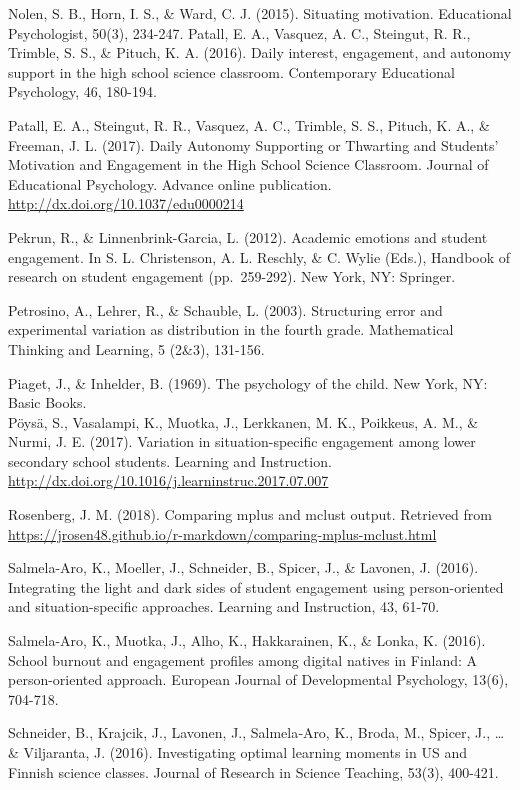 \documentclass[]{msu-thesis}
\theoremstyle{definition}
\theoremstyle{definition}
\theoremstyle{definition}
\theoremstyle{remark}
\begin{document}
Nolen, S. B., Horn, I. S., \& Ward, C. J. (2015). Situating motivation.
Educational Psychologist, 50(3), 234-247. Patall, E. A., Vasquez, A. C.,
Steingut, R. R., Trimble, S. S., \& Pituch, K. A. (2016). Daily
interest, engagement, and autonomy support in the high school science
classroom. Contemporary Educational Psychology, 46, 180-194.

Patall, E. A., Steingut, R. R., Vasquez, A. C., Trimble, S. S., Pituch,
K. A., \& Freeman, J. L. (2017). Daily Autonomy Supporting or Thwarting
and Students' Motivation and Engagement in the High School Science
Classroom. Journal of Educational Psychology. Advance online
publication. \url{http://dx.doi.org/10.1037/edu0000214}

Pekrun, R., \& Linnenbrink-Garcia, L. (2012). Academic emotions and
student engagement. In S. L. Christenson, A. L. Reschly, \& C. Wylie
(Eds.), Handbook of research on student engagement (pp.~259-292). New
York, NY: Springer.

Petrosino, A., Lehrer, R., \& Schauble, L. (2003). Structuring error and
experimental variation as distribution in the fourth grade. Mathematical
Thinking and Learning, 5 (2\&3), 131-156.

Piaget, J., \& Inhelder, B. (1969). The psychology of the child. New
York, NY: Basic Books.\\
Pöysä, S., Vasalampi, K., Muotka, J., Lerkkanen, M. K., Poikkeus, A. M.,
\& Nurmi, J. E. (2017). Variation in situation-specific engagement among
lower secondary school students. Learning and Instruction.
\url{http://dx.doi.org/10.1016/j.learninstruc.2017.07.007}

Rosenberg, J. M. (2018). Comparing mplus and mclust output. Retrieved
from
\url{https://jrosen48.github.io/r-markdown/comparing-mplus-mclust.html}

Salmela-Aro, K., Moeller, J., Schneider, B., Spicer, J., \& Lavonen, J.
(2016). Integrating the light and dark sides of student engagement using
person-oriented and situation-specific approaches. Learning and
Instruction, 43, 61-70.

Salmela-Aro, K., Muotka, J., Alho, K., Hakkarainen, K., \& Lonka, K.
(2016). School burnout and engagement profiles among digital natives in
Finland: A person-oriented approach. European Journal of Developmental
Psychology, 13(6), 704-718.

Schneider, B., Krajcik, J., Lavonen, J., Salmela‐Aro, K., Broda, M.,
Spicer, J., \ldots{} \& Viljaranta, J. (2016). Investigating optimal
learning moments in US and Finnish science classes. Journal of Research
in Science Teaching, 53(3), 400-421.
\end{document}
